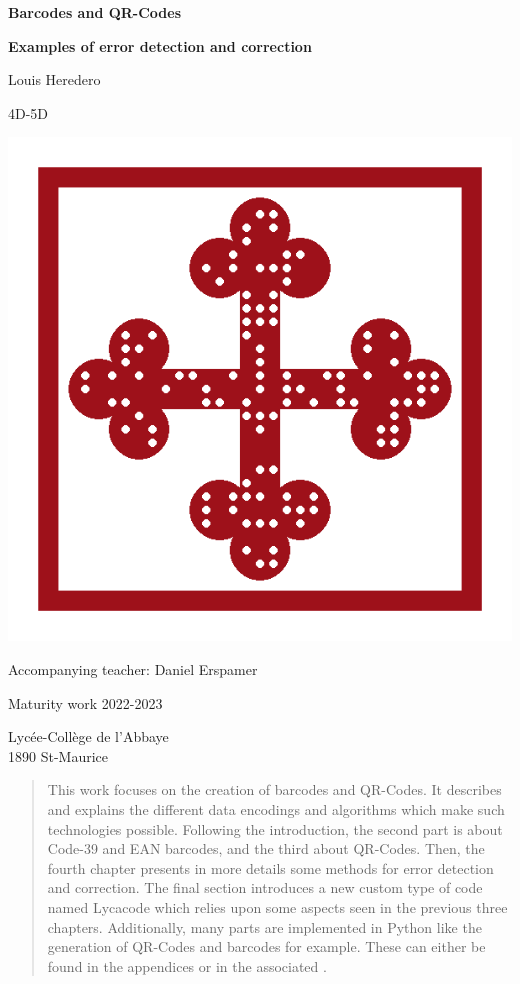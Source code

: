 \begin{titlepage}
  \begin{center}
    \Huge \textbf{Barcodes and QR-Codes}

    \large \textbf{Examples of error detection and correction}

    \vspace{1cm}

    \LARGE Louis Heredero

    \large 4D-5D

    \includegraphics[width=0.7\linewidth]{images/lycacode_ex_final}

    \Large Accompanying teacher: Daniel Erspamer

    \vspace{2cm}

    \LARGE Maturity work 2022-2023
    \vspace{1cm}

    \Large Lycée-Collège de l'Abbaye \\ 1890 St-Maurice

  \end{center}
\end{titlepage}

\begin{abstract}
  This work focuses on the creation of barcodes and QR-Codes. It describes and explains the different data encodings and algorithms which make such technologies possible. Following the introduction, the second part is about Code-39 and EAN barcodes, and the third about QR-Codes. Then, the fourth chapter presents in more details some methods for error detection and correction. The final section introduces a new custom type of code named Lycacode which relies upon some aspects seen in the previous three chapters. Additionally, many parts are implemented in Python like the generation of QR-Codes and barcodes for example. These can either be found in the appendices or in the associated .
\end{abstract}

\tableofcontents
\listoffigures
\listoftables
